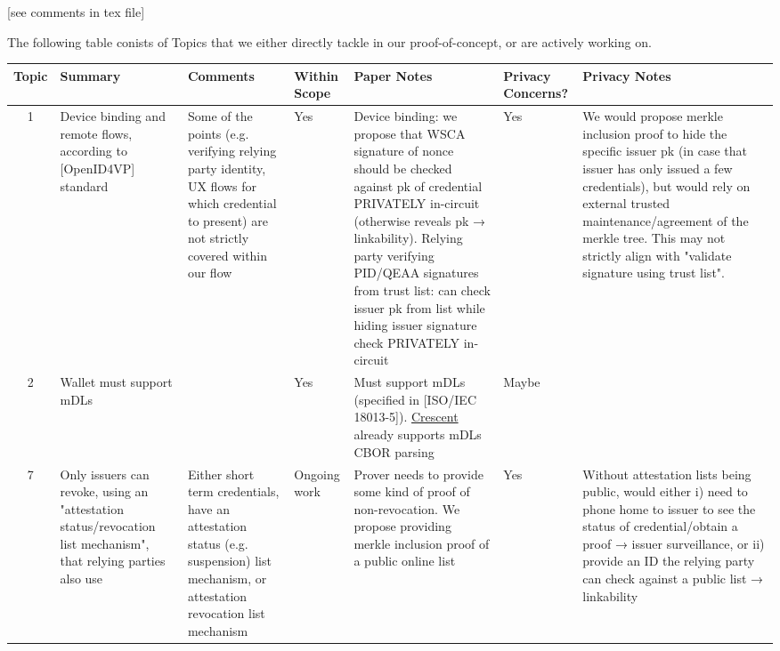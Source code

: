 [see comments in tex file]

The following table conists of Topics that we either directly tackle in our proof-of-concept, or are actively working on. 

\footnotesize
\begin{longtable}{|c|p{}|p{}|p{}|p{}|p{}|p{}|}
\hline
\textbf{Topic} & \textbf{Summary} & \textbf{Comments} & \textbf{Within Scope} & \textbf{Paper Notes} & \textbf{Privacy Concerns?} & \textbf{Privacy Notes} \\
\hline
\endhead

1 & Device binding and remote flows, according to [OpenID4VP] standard & Some of the points (e.g. verifying relying party identity, UX flows for which credential to present) are not strictly covered within our flow & Yes & Device binding: we propose that WSCA signature of nonce should be checked against pk of credential PRIVATELY in-circuit (otherwise reveals pk → linkability). Relying party verifying PID/QEAA signatures from trust list: can check issuer pk from list while hiding issuer signature check PRIVATELY in-circuit & Yes & We would propose merkle inclusion proof to hide the specific issuer pk (in case that issuer has only issued a few credentials), but would rely on external trusted maintenance/agreement of the merkle tree. This may not strictly align with "validate signature using trust list". \\
\hline

2 & Wallet must support mDLs & & Yes & Must support mDLs (specified in [ISO/IEC 18013-5]). \href{https://github.com/microsoft/crescent-credentials}{Crescent} already supports mDLs CBOR parsing & Maybe & \\
\hline

7 & Only issuers can revoke, using an "attestation status/revocation list mechanism", that relying parties also use & Either short term credentials, have an attestation status (e.g. suspension) list mechanism, or attestation revocation list mechanism & Ongoing work & Prover needs to provide some kind of proof of non-revocation. We propose providing merkle inclusion proof of a public online list & Yes & Without attestation lists being public, would either i) need to phone home to issuer to see the status of credential/obtain a proof → issuer surveillance, or ii) provide an ID the relying party can check against a public list → linkability \\
\hline


\end{longtable}
